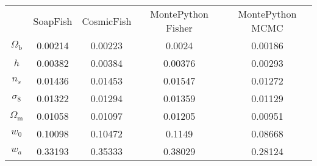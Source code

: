 \begin{table}
\centering
\begin{tabular}{|c|c|c|c|c|}
 & SoapFish & CosmicFish & MontePython Fisher & MontePython MCMC \\
$\Omega_\mathrm{b}$ & 0.00214 & 0.00223 & 0.0024 & 0.00186 \\
$h$ & 0.00382 & 0.00384 & 0.00376 & 0.00293 \\
$n_s$ & 0.01436 & 0.01453 & 0.01547 & 0.01272 \\
$\sigma_8$ & 0.01322 & 0.01294 & 0.01359 & 0.01129 \\
$\Omega_\mathrm{m}$ & 0.01058 & 0.01097 & 0.01205 & 0.00951 \\
$w_0$ & 0.10098 & 0.10472 & 0.1149 & 0.08668 \\
$w_a$ & 0.33193 & 0.35333 & 0.38029 & 0.28124 \\
\end{tabular}
\end{table}
